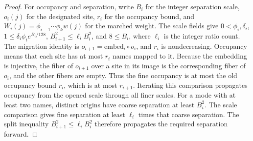 \begin{proof}
For occupancy and separation, write $B_i$ for the integer separation scale, $o_i(j)$ for the designated site, $r_i$ for the occupancy bound, and $W_i(j)=\phi_{i-1}\cdots\phi_k w(j)$ for the marched weight. The scale fields give $0<\phi_i,\delta_i$, $1\leq\delta_i\phi_i e^{B_i/128}$, $B_{i+1}^2\leq \ell_iB_i^2$, and $8\leq B_i$, where $\ell_i$ is the integer ratio count. The migration identity is $o_{i+1}=\mathrm{embed}_i\circ o_i$, and $r_i$ is nondecreasing. Occupancy means that each site has at most $r_i$ names mapped to it. Because the embedding is injective, the fiber of $o_{i+1}$ over a site in its image is the corresponding fiber of $o_i$, and the other fibers are empty. Thus the fine occupancy is at most the old occupancy bound $r_i$, which is at most $r_{i+1}$. Iterating this comparison propagates occupancy from the opened scale through all finer scales. For a mode with at least two names, distinct origins have coarse separation at least $B_i^2$. The scale comparison gives fine separation at least $\ell_i$ times that coarse separation. The split inequality $B_{i+1}^2\leq \ell_iB_i^2$ therefore propagates the required separation forward.


\end{proof}
